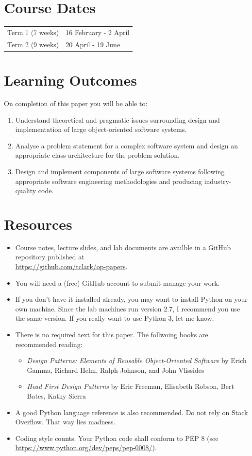 \documentclass{article}
\begin{document}
\section*{Course Dates}
\begin{tabular}{ll}
Term 1 (7 weeks) & 16 February - 2 April\\
Term 2 (9 weeks) & 20 April - 19 June\\
\end{tabular}

\section*{Learning Outcomes}
On completion of this paper you will be able to:
\begin{enumerate}
    \item Understand theoretical and pragmatic issues surrounding design and implementation of large object-oriented software systems.
    \item Analyse a problem statement for a complex software system and design an appropriate class architecture for the problem solution.
    \item Design and implement components of large software systems following appropriate software engineering methodologies and producing industry-quality code.
\end{enumerate}

\section*{Resources}
\begin{itemize}
	\item Course notes, lecture slides, and lab documents are availble in a GitHub repository published at \\ \url{https://github.com/tclark/op-papers}.
	\item You will need a (free) GitHub account to submit manage your work.
	\item If you don't have it installed already, you may want to install Python on your own machine.  Since the lab machines run version 2.7, I recommend you use the same version.  If you really want to use Python 3, let me know.
	\item There is no required text for this paper.  The follwoing books are recommended reading:
		\begin{itemize}
			\item \emph{Design Patterns: Elements of Reusable Object-Oriented Software} by Erich Gamma, Richard Helm, Ralph Johnson, and John Vlissides
			\item \emph{Head First Design Patterns} by Eric Freeman, Elisabeth Robson, Bert Bates, Kathy Sierra
		\end{itemize}
	\item A good Python language reference is also recommended. Do not rely on Stack Overflow.  That way lies madness.
	\item Coding style counts.  Your Python code shall conform to PEP 8 (see
		\url{https://www.python.org/dev/peps/pep-0008/}).
\end{itemize}
\end{document}
